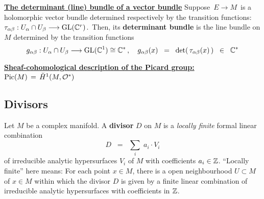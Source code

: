 \vskip 0.5cm
\noindent
\underline{\textbf{The determinant (line) bundle of a vector bundle}}
\vskip 0.1cm
\noindent
Suppose
\,$E \longrightarrow M$\,
is a holomorphic vector bundle
determined respectively by the transition functions:
\,$\tau_{\alpha\beta} : U_{\alpha} \cap U_{\beta} \longrightarrow \textnormal{GL}(\mathbb{C}^{r})$.\,
Then, its \textbf{determinant bundle} is the line bundle on $M$
determined by the transition functions
\begin{equation*}
g_{\alpha\beta} : U_{\alpha} \cap U_{\beta} \longrightarrow \textnormal{GL}(\mathbb{C}^{1}) \cong \mathbb{C}^{*}\,,
\quad
g_{\alpha\beta}(x)
\;\; = \;\;
	\det\!\left(\,\tau_{\alpha\beta}(x)\,\right)
\;\; \in \;\;
	\mathbb{C}^{*}
\end{equation*}

\vskip 0.5cm
\noindent
\underline{\textbf{Sheaf-cohomological description of the Picard group: $\textnormal{Pic}(M) \,=\, \breve{H}^{1}(M,\mathcal{O}^{*})$}}
\vskip 0.1cm
\noindent


\subsection{Divisors}

Let $M$ be a complex manifold.
A \textbf{divisor} $D$ on $M$ is a \textit{locally finite} formal linear combination
\begin{equation*}
D
\;\; = \;\;
	\underset{i}{\sum}\;a_{i} \cdot V_{i}
\end{equation*}
of irreducible analytic hypersurfaces $V_{i}$ of $M$ with coefficients $a_{i} \in \mathbb{Z}$.
``Locally finite'' here means:
For each point $x \in M$, there is a open neighbourhood $U \subset M$ of $x \in M$ within which
the divisor $D$ is given by a finite linear combination of irreducible analytic hypersurfaces with coefficients in $\mathbb{Z}$.

